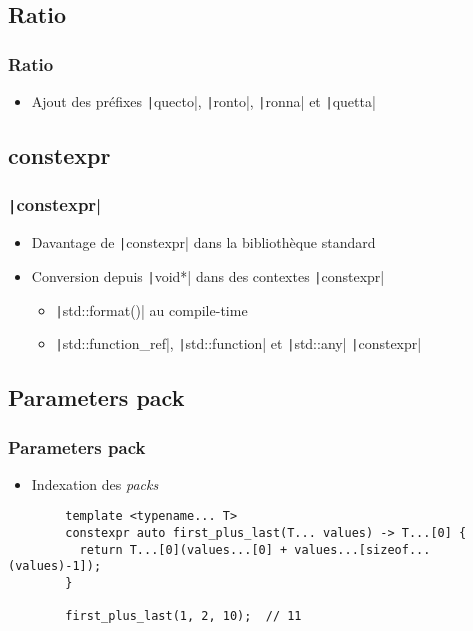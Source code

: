 \documentclass[C++.tex]{subfiles}
\begin{document}
\subsection*{Ratio}
\begin{frame}[fragile]
	\frametitle{Ratio}
	\begin{itemize}
		\item Ajout des préfixes \texttt|quecto|, \texttt|ronto|, \texttt|ronna| et \texttt|quetta|
	\end{itemize}
\end{frame}

\subsection*{constexpr}
\begin{frame}[fragile]
	\frametitle{\texttt|constexpr|}
	\begin{itemize}
		\item Davantage de \texttt|constexpr| dans la bibliothèque standard
		\item Conversion depuis \texttt|void*| dans des contextes \texttt|constexpr|
		\begin{itemize}
			\item \texttt|std::format()| au compile-time
			\item \texttt|std::function_ref|, \texttt|std::function| et \texttt|std::any| \texttt|constexpr|
		\end{itemize}
	\end{itemize}
\end{frame}

\subsection*{Parameters pack}
\begin{frame}[fragile]
	\frametitle{Parameters pack}
	\begin{itemize}
		\item Indexation des \textit{packs}
	\end{itemize}

	\begin{verbatim}
		template <typename... T>
		constexpr auto first_plus_last(T... values) -> T...[0] {
		  return T...[0](values...[0] + values...[sizeof...(values)-1]);
		}

		first_plus_last(1, 2, 10);  // 11
	\end{verbatim}
\end{frame}
\end{document}
